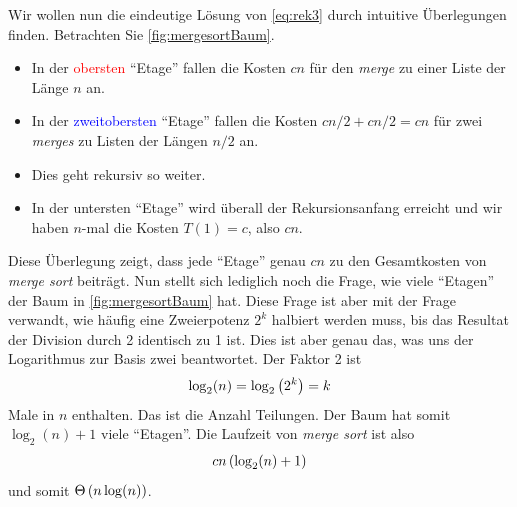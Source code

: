 Wir wollen nun die eindeutige Lösung von \cref{eq:rek3} durch intuitive Überlegungen finden. Betrachten Sie \cref{fig:mergesortBaum}.
\begin{itemize}
	\item In der \textcolor{Red}{obersten} \enquote{Etage} fallen die Kosten $cn$ für den \textit{merge} zu einer Liste der Länge $n$ an.
	\item In der \textcolor{Blue}{zweitobersten} \enquote{Etage} fallen die Kosten $cn/2 + cn/2 = cn$ für zwei \textit{merges} zu Listen der Längen $n/2$ an.
	\item Dies geht rekursiv so weiter.
	\item In der untersten \enquote{Etage} wird überall der Rekursionsanfang erreicht und wir haben $n$-mal die Kosten $T(1) = c$, also $cn$.
\end{itemize}
Diese Überlegung zeigt, dass jede \enquote{Etage} genau $cn$ zu den Gesamtkosten von \textit{merge sort} beiträgt. Nun stellt sich lediglich noch die Frage, wie viele \enquote{Etagen} der Baum in \cref{fig:mergesortBaum} hat. Diese Frage ist aber mit der Frage verwandt, wie häufig eine Zweierpotenz $2^k$ halbiert werden muss, bis das Resultat der Division durch 2 identisch zu 1 ist. Dies ist aber genau das, was uns der Logarithmus zur Basis zwei beantwortet. Der Faktor 2 ist
\begin{align*}
	\log_2(n) = \log_2\left(2^k\right) = k
\end{align*}
Male in $n$ enthalten. Das ist die Anzahl Teilungen. Der Baum hat somit $\log_2(n) + 1$ viele \enquote{Etagen}. Die Laufzeit von \textit{merge sort} ist also
\begin{align*}
	cn\left(\log_2(n) + 1\right)
\end{align*}
und somit $\Theta\left(n\log(n)\right)$.

